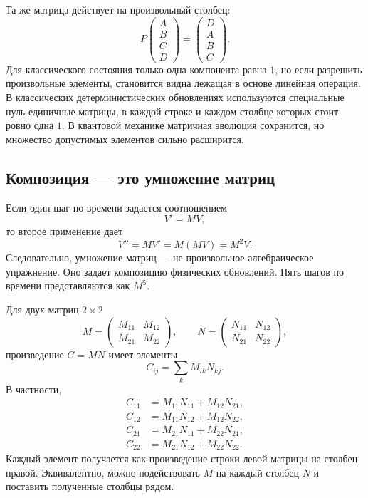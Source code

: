 Та же матрица действует на произвольный столбец:
\begin{equation}
  P
  \begin{pmatrix}A\\B\\C\\D\end{pmatrix}
  =
  \begin{pmatrix}D\\A\\B\\C\end{pmatrix}.
  \label{eq:l01-cyclic-shift}
\end{equation}
Для классического состояния только одна компонента равна \(1\), но если разрешить произвольные элементы, становится видна лежащая в основе линейная операция. В классических детерминистических обновлениях используются специальные нуль-единичные матрицы, в каждой строке и каждом столбце которых стоит ровно одна \(1\). В квантовой механике матричная эволюция сохранится, но множество допустимых элементов сильно расширится.

\subsection{Композиция — это умножение матриц}

Если один шаг по времени задается соотношением
\begin{equation}
  V'=MV,
\end{equation}
то второе применение дает
\begin{equation}
  V''=MV'=M(MV)=M^2V.
  \label{eq:l01-two-updates}
\end{equation}
Следовательно, умножение матриц — не произвольное алгебраическое упражнение. Оно задает композицию физических обновлений. Пять шагов по времени представляются как \(M^5\).

Для двух матриц \(2\times2\)
\begin{equation}
  M=
  \begin{pmatrix}
    M_{11}&M_{12}\\
    M_{21}&M_{22}
  \end{pmatrix},
  \qquad
  N=
  \begin{pmatrix}
    N_{11}&N_{12}\\
    N_{21}&N_{22}
  \end{pmatrix},
\end{equation}
произведение \(C=MN\) имеет элементы
\begin{equation}
  C_{ij}=\sum_k M_{ik}N_{kj}.
  \label{eq:l01-matrix-product}
\end{equation}
В частности,
\begin{align}
  C_{11}&=M_{11}N_{11}+M_{12}N_{21},\\
  C_{12}&=M_{11}N_{12}+M_{12}N_{22},\\
  C_{21}&=M_{21}N_{11}+M_{22}N_{21},\\
  C_{22}&=M_{21}N_{12}+M_{22}N_{22}.
\end{align}
Каждый элемент получается как произведение строки левой матрицы на столбец правой. Эквивалентно, можно подействовать \(M\) на каждый столбец \(N\) и поставить полученные столбцы рядом.

